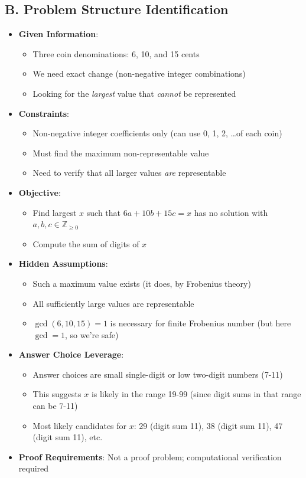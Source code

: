 \documentclass[12pt]{article}
\begin{document}
\begin{problemconfigbox}
\subsection*{B. Problem Structure Identification}
\begin{itemize}[leftmargin=*]
    \item \textbf{Given Information}: 
    \begin{itemize}
        \item Three coin denominations: 6, 10, and 15 cents
        \item We need exact change (non-negative integer combinations)
        \item Looking for the \textit{largest} value that \textit{cannot} be represented
    \end{itemize}
    \item \textbf{Constraints}: 
    \begin{itemize}
        \item Non-negative integer coefficients only (can use 0, 1, 2, \ldots of each coin)
        \item Must find the maximum non-representable value
        \item Need to verify that all larger values \textit{are} representable
    \end{itemize}
    \item \textbf{Objective}: 
    \begin{itemize}
        \item Find largest $x$ such that $6a + 10b + 15c = x$ has no solution with $a, b, c \in \mathbb{Z}_{\geq 0}$
        \item Compute the sum of digits of $x$
    \end{itemize}
    \item \textbf{Hidden Assumptions}: 
    \begin{itemize}
        \item Such a maximum value exists (it does, by Frobenius theory)
        \item All sufficiently large values are representable
        \item $\gcd(6, 10, 15) = 1$ is necessary for finite Frobenius number (but here $\gcd = 1$, so we're safe)
    \end{itemize}
    \item \textbf{Answer Choice Leverage}: 
    \begin{itemize}
        \item Answer choices are small single-digit or low two-digit numbers (7-11)
        \item This suggests $x$ is likely in the range 19-99 (since digit sums in that range can be 7-11)
        \item Most likely candidates for $x$: 29 (digit sum 11), 38 (digit sum 11), 47 (digit sum 11), etc.
    \end{itemize}
    \item \textbf{Proof Requirements}: Not a proof problem; computational verification required
\end{itemize}


\end{problemconfigbox}
\end{document}
